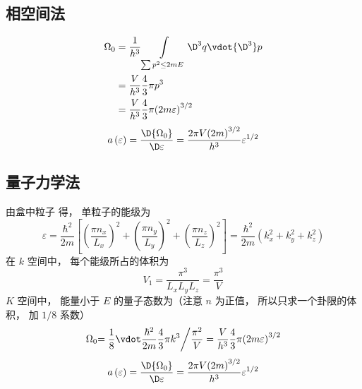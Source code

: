 
\subsection{相空间法}
\begin{equation}
    \begin{aligned}
    {\Omega_0} & = \frac{1}{h^3}\int\limits_{\sum {p^2}  \le 2mE} {{ \D ^3}q \vdot { \D ^3}p}  \\
    & = \frac{V}{h^3}\frac{4}{3}\pi {p^3} \\
    & = \frac{V}{h^3}\frac{4}{3}\pi {\left( {2m\varepsilon } \right)^{3/2}}
    \end{aligned}
  \end{equation}
  \begin{equation}
    a\left( \varepsilon  \right) = \frac{ \D {\Omega_0}}{ \D \varepsilon } = \frac{2\pi V{{\left( {2m} \right)}^{3/2}}}{h^3}{\varepsilon ^{1/2}}
  \end{equation}

\subsection{量子力学法}
由盒中粒子%
得， 单粒子的能级为
\begin{equation}
\varepsilon = \frac{\hbar ^2}{2m}\left[ {{{\left( {\frac{\pi {n_x}}{L_x}} \right)}^2} + {{\left( {\frac{\pi {n_y}}{L_y}} \right)}^2} + {{\left( {\frac{\pi {n_z}}{L_z}} \right)}^2}} \right] = \frac{\hbar ^2}{2m}\left( {k_x^2 + k_y^2 + k_z^2} \right)
\end{equation}
在 $k$ 空间中， 每个能级所占的体积为
\begin{equation}
{V_1} = \frac{\pi ^3}{{L_x}{L_y}{L_z}} = \frac{\pi ^3}{V}
\end{equation}
  $K$ 空间中， 能量小于 $E$ 的量子态数为（注意 $n$ 为正值， 所以只求一个卦限的体积， 加 $1/8$ 系数）
\begin{equation}
    {\Omega_0}{{ = \frac{1}{8} \vdot \frac{\hbar ^2}{2m}\frac{4}{3}\pi {k^3}} \mathord{\left/
 {\vphantom {{ = \frac{1}{8} \vdot \frac{\hbar ^2}{2m}\frac{4}{3}\pi {k^3}} {\frac{\pi ^2}{V}}}} \right.
 \kern-\nulldelimiterspace} {\frac{\pi ^2}{V}}} = \frac{V}{h^3}\frac{4}{3}\pi {\left( {2m\varepsilon } \right)^{3/2}}
\end{equation}
\begin{equation}
      a\left( \varepsilon  \right) = \frac{ \D {\Omega_0}}{ \D \varepsilon } = \frac{2\pi V{{\left( {2m} \right)}^{3/2}}}{h^3}{\varepsilon ^{1/2}}
\end{equation}

